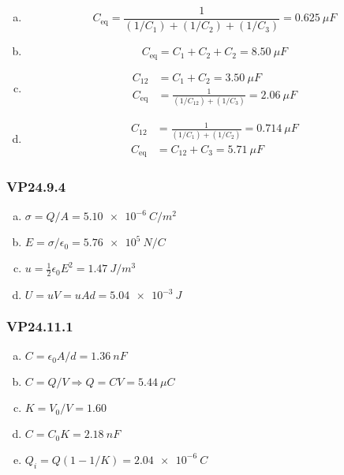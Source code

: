 \documentclass{article}
\begin{document}
\begin{enumerate}[(a)]
  \item \[C_\textrm{eq} = \frac{1}{(1/C_1) + (1/C_2) + (1/C_3)} = \qty{0.625}{\mu F}\]

  \item \[C_\textrm{eq} = C_1 + C_2 + C_2 = \qty{8.50}{\mu F}\]

  \item

        \begin{align*}
          C_{12}        & = C_1 + C_2 = \qty{3.50}{\mu F}                          \\
          C_\textrm{eq} & = \frac{1}{(1 / C_{12}) + (1 / C_3)} = \qty{2.06}{\mu F}
        \end{align*}

  \item
        \begin{align*}
          C_{12}        & = \frac{1}{(1 / C_1) + (1 / C_2)} = \qty{0.714}{\mu F} \\
          C_\textrm{eq} & = C_{12} + C_3 = \qty{5.71}{\mu F}
        \end{align*}
\end{enumerate}

\subsubsection{VP24.9.4}

\begin{enumerate}[(a)]
  \item $\sigma = Q / A = \qty{5.10e-6}{C/m^2}$

  \item $E = \sigma / \epsilon_0 = \qty{5.76e5}{N/C}$

  \item $u = \frac{1}{2} \epsilon_0 E^2 = \qty{1.47}{J/m^3}$

  \item $U = u V = u A d = \qty{5.04e-3}{J}$
\end{enumerate}

\subsubsection{VP24.11.1}

\begin{enumerate}[(a)]
  \item $C = \epsilon_0 A / d = \qty{1.36}{n F}$

  \item $C = Q / V \Rightarrow Q = C V = \qty{5.44}{\mu C}$

  \item $K = V_0 / V = 1.60$

  \item $C = C_0 K = \qty{2.18}{n F}$

  \item $Q_i = Q (1 - 1 / K) = \qty{2.04e-6}{C}$
\end{enumerate}
\end{document}
